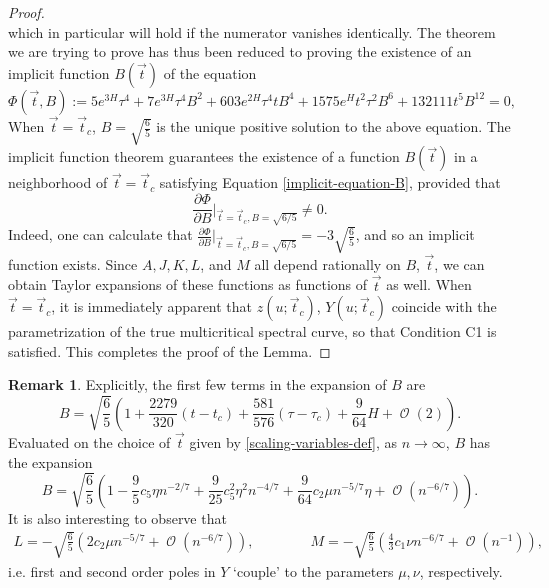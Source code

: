 \documentclass[usenames,dvipsnames]{article}
\theoremstyle{definition}
\newtheorem{remark}{Remark}[section]
\DeclareMathOperator{\OO}{\mathcal{O}}
\numberwithin{equation}{section}
\numberwithin{figure}{section}
\begin{document}
\begin{proof}
\begin{equation*}
    \end{equation*}
which in particular will hold if the numerator vanishes identically. The theorem we are trying to prove has thus been reduced to proving the existence
of an implicit function $B(\vec{t})$ of the equation
    \begin{equation} \label{implicit-equation-B}
        \Phi(\vec{t},B) := 5e^{3H}\tau^4 + 7e^{3H}\tau^4B^2 + 603e^{2H}\tau^4 tB^4 + 1575e^Ht^2\tau^2B^6 + 132111t^5B^{12} = 0,
    \end{equation}
When $\vec{t}=\vec{t}_c$, $B = \sqrt{\frac{6}{5}}$ is the unique positive solution to the above equation. The implicit function theorem guarantees the existence of a function $B(\vec{t})$ in a neighborhood of $\vec{t}=\vec{t}_c$ satisfying Equation \eqref{implicit-equation-B},
provided that 
    \begin{equation*}
        \frac{\partial \Phi}{\partial B} \bigg|_{\vec{t}=\vec{t}_c,B=\sqrt{6/5}} \neq 0.
    \end{equation*} 
Indeed, one can calculate that $\frac{\partial \Phi}{\partial B} \vert_{\vec{t}=\vec{t}_c,B=\sqrt{6/5}} = -3\sqrt{\frac{6}{5}}$, and so an implicit function exists. 
Since $A,J,K,L$, and $M$ all depend rationally on $B$, $\vec{t}$, we can obtain Taylor expansions of these functions as
functions of $\vec{t}$ as well. 
When $\vec{t} =\vec{t}_c$, it is immediately apparent that $z(u;\vec{t}_c)$, $Y(u;\vec{t}_c)$ coincide with the parametrization of 
the true multicritical spectral curve, so that Condition C1 is satisfied. This completes the proof of the Lemma.
\end{proof}


\begin{remark}
Explicitly, the first few terms in the expansion of $B$ are
    \begin{equation*}
        B = \sqrt{\frac{6}{5}}\left(1 + \frac{2279}{320}(t-t_c) + \frac{581}{576}(\tau-\tau_c) + \frac{9}{64}H + \OO(2)\right).
    \end{equation*}
Evaluated on the choice of $\vec{t}$ given by \eqref{scaling-variables-def}, as $n\to \infty$, $B$ has the expansion
    \begin{equation*}
        B = \sqrt{\frac{6}{5}}\left(1 - \frac{9}{5}c_5\eta n^{-2/7} + \frac{9}{25}c_5^2\eta^2 n^{-4/7} + \frac{9}{64}c_2\mu n^{-5/7}\eta +\OO(n^{-6/7})\right).
    \end{equation*}
It is also interesting to observe that
    \begin{align*}
        L = -\sqrt{\frac{6}{5}}\left(2c_2\mu n^{-5/7} + \OO(n^{-6/7})\right),\qquad\qquad M = -\sqrt{\frac{6}{5}}\left(\frac{4}{3}c_1\nu n^{-6/7} + \OO(n^{-1})\right),
    \end{align*}
i.e. first and second order poles in $Y$ `couple' to the parameters $\mu,\nu$, respectively.
\end{remark}
\end{document}
